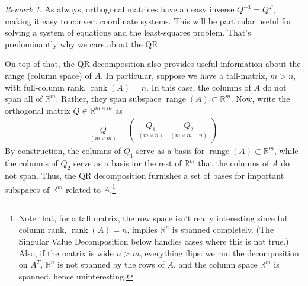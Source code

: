 \documentclass[12pt]{book}
\numberwithin{equation}{section} %
\theoremstyle{plain}
\theoremstyle{definition}
\theoremstyle{remark}
\newtheorem*{rmk}{Remark}
\newcommand{\R}{\mathbb{R}}
\newcommand{\Rn}{\mathbb{R}^n}
\newcommand{\Rm}{\mathbb{R}^m}
\newcommand{\range}{\operatorname{range}}
\newcommand{\rank}{\operatorname{rank}}
\begin{document}
\begin{rmk}
As always, orthogonal matrices have an easy inverse $Q^{-1}=Q^T$, making
it easy to convert coordinate systems. This will be particular useful
for solving a system of equations and the least-squares problem. That's
predominantly why we care about the QR.

On top of that, the QR decomposition also provides useful information
about the range (column space) of $A$. In particular, suppose
we have a tall-matrix, $m>n$, with full-column rank, $\rank(A)=n$. In
this case, the columns of $A$ do not span all of $\Rm$. Rather, they
span subspace $\range(A)\subset \Rm$. Now, write the orthogonal matrix
$Q\in\R^{m\times m}$ as
\begin{align*}
  \underset{(m\times m)}{Q} =
  \begin{pmatrix}
    \underset{(m\times n)}{Q_1}
    & \underset{(m\times m-n)}{Q_2}
  \end{pmatrix}
\end{align*}
By construction, the columns of $Q_1$ serve as a basis for
$\range(A)\subset\Rm$, while the columns of $Q_2$ serve as a basis for
the rest of $\Rm$ that the columns of $A$ do not span. Thus, the QR
decomposition furnishes a set of bases for important subspaces of
$\Rm$ related to $A$.\footnote{%
  Note that, for a tall matrix, the row space isn't really interesting
  since full column rank, $\rank(A)=n$, implies $\Rn$ is spanned
  completely. (The Singular Value Decomposition below handles cases
  where this is not true.) Also, if the matrix is wide $n>m$, everything
  flips: we run the decomposition on $A^T$, $\Rn$ is not spanned by the
  rows of $A$, and the column space $\Rm$ is spanned, hence
  uninteresting.
}
\end{rmk}
\end{document}
